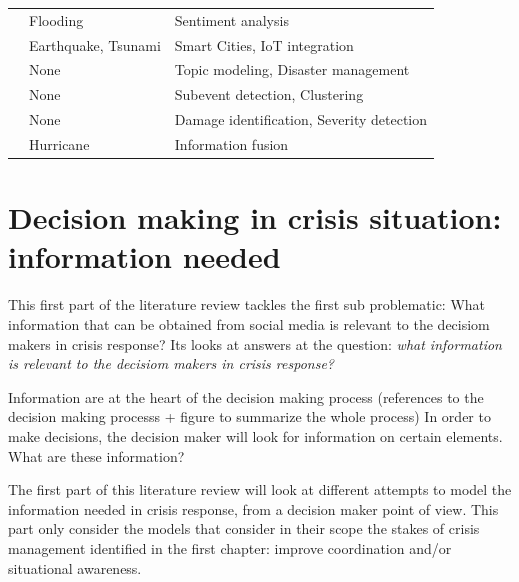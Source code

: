 \begin{table}[bp]
\begin{tabular}{m{} m{} m{}}
        \cite{raginiBigDataAnalytics2018a}               & Flooding              & Sentiment analysis                                       \\
        \cite{shahDisasterResilientSmart2019a}           & Earthquake, Tsunami   & Smart Cities, IoT integration                            \\
        \cite{grunder-fahrerTopicsTopicalPhases2018a}    & None                  & Topic modeling, Disaster management                      \\
        \cite{wuStreamExplorerMultiStageSystem2018a}     & None                  & Subevent detection, Clustering                           \\
        \cite{agarwalCrisisDIASMultimodalDamage2020a}    & None                  & Damage identification, Severity detection                \\
        \cite{alamDescriptiveVisualSummaries2020a}       & Hurricane             & Information fusion                                       \\
        \bottomrule
    \end{tabular}
    \label{table:crisis-informatic-main-articles}
\end{table}


\section{Decision making in crisis situation: information needed}
This first part of the literature review tackles the first sub problematic: What information that can be obtained from social media is relevant to the decisiom makers in crisis response?
Its looks at answers at the question: \emph{what information is relevant to the decisiom makers in crisis response?}

Information are at the heart of the decision making process (references to the decision making processs + figure to summarize the whole process)
In order to make decisions, the decision maker will look for information on certain elements.
What are these information?

The first part of this literature review will look at different attempts to model the information needed in crisis response, from a decision maker point of view.
This part only consider the models that consider in their scope the stakes of crisis management identified in the first chapter: improve coordination and/or situational awareness.

